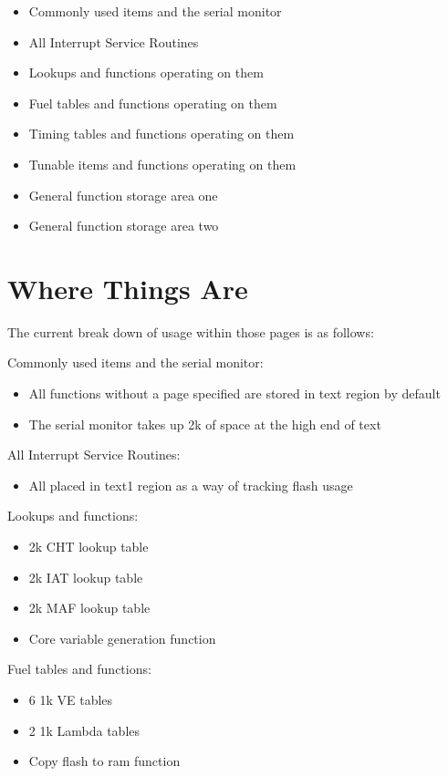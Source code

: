 \documentclass[12pt,a4paper,titlepage]{article}
\begin{document}
\begin{titlepage}
\begin{center}
\begin{itemize}
\item Commonly used items and the serial monitor
\item All Interrupt Service Routines
\item Lookups and functions operating on them
\item Fuel tables and functions operating on them
\item Timing tables and functions operating on them
\item Tunable items and functions operating on them
\item General function storage area one
\item General function storage area two
\end{itemize}




\section{Where Things Are}

The current break down of usage within those pages is as follows:

Commonly used items and the serial monitor:

\begin{itemize}
\item All functions without a page specified are stored in text region by default
\item The serial monitor takes up 2k of space at the high end of text
\end{itemize}

All Interrupt Service Routines:

\begin{itemize}
\item All placed in text1 region as a way of tracking flash usage
\end{itemize}


Lookups and functions:

\begin{itemize}
\item 2k CHT lookup table
\item 2k IAT lookup table
\item 2k MAF lookup table
\item Core variable generation function
\end{itemize}


Fuel tables and functions:

\begin{itemize}
\item 6 1k VE tables
\item 2 1k Lambda tables
\item Copy flash to ram function
\end{itemize}



\end{center}
\end{titlepage}
\end{document}
